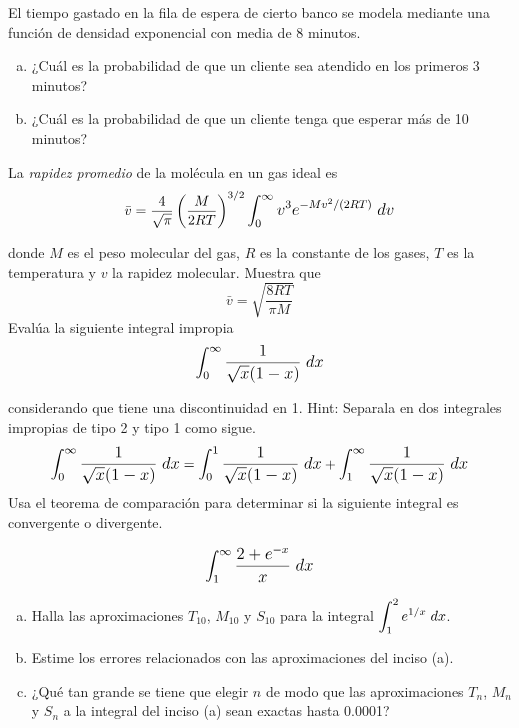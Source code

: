 \documentclass[9pt]{exam}
\begin{document}
\begin{questions}
\vskip10pt
\question
El tiempo gastado en la fila de espera de cierto banco se modela mediante una función de densidad exponencial con media de 8 minutos.
\begin{enumerate}[a)]
\item ¿Cuál es la probabilidad de que un cliente sea atendido en los primeros 3 minutos?
\item ¿Cuál es la probabilidad de que un cliente tenga que esperar más de 10 minutos?
\end{enumerate}
\vskip10pt
    \question La \textit{rapidez promedio} de la molécula en un gas ideal es
    $$\bar{v}=\frac{4}{\sqrt{\pi}}\left(\frac{M}{2RT}\right)^{3/2}\mathlarger{\int_0^\infty v^3e^{-Mv^2/(2RT)}\;dv}$$
    
    donde $M$ es el peso molecular del gas, $R$ es la constante de los gases, $T$ es la temperatura y $v$ la rapidez molecular. Muestra que
    $$\bar{v}=\sqrt{\frac{8RT}{\pi M}}$$
\vskip12pt    
    \question Evalúa la siguiente integral impropia 
    $$\mathlarger{\int_0^{\infty} \frac{1}{\sqrt{x}(1-x)}\;dx}$$
    
    considerando que tiene una discontinuidad en 1. Hint: Separala en dos integrales impropias de tipo 2 y tipo 1 como sigue. 
        $$\mathlarger{\int_0^{\infty} \frac{1}{\sqrt{x}(1-x)}\;dx}=\mathlarger{\int_0^1 \frac{1}{\sqrt{x}(1-x)}\;dx}+\mathlarger{\int_1^{\infty} \frac{1}{\sqrt{x}(1-x)}\;dx}$$
\vskip12pt    
    \question Usa el teorema de comparación para determinar si la siguiente integral es convergente o divergente. 
    
    $$\mathlarger{\int_1^{\infty}\frac{2+e^{-x}}{x}\;dx}$$
  
  
  
 \vskip10pt 
  \question 
  \begin{enumerate}[(a)]
  \item Halla las aproximaciones $T_{10}$, $M_{10}$ y $S_{10}$ para la integral $\mathlarger{\int_1^2e^{1/x}\;dx}$.
  \item Estime los errores relacionados con las aproximaciones del inciso (a).
  \item ¿Qué tan grande se tiene que elegir $n$ de modo que las aproximaciones $T_n$, $M_n$ y $S_n$ a la integral del inciso (a) sean exactas hasta 0.0001?
  \end{enumerate}
  
    \end{questions}
\end{document}

